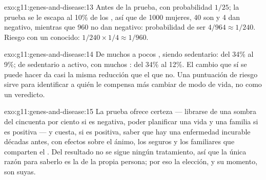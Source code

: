 \begin{solution}{exo:g11:genes-and-disease:13}
Antes de la prueba,  con probabilidad $1/25$; la prueba se le
escapa al 10\% de los , así que de 1000 mujeres, 40 son
 y 4 dan negativo, mientras que 960 no  dan
negativo: probabilidad de ser  $4/964 \approx 1/240$. Riesgo
con un  conocido: $1/240 \times 1/4
\approx 1/960$.
\end{solution}

\begin{solution}{exo:g11:genes-and-disease:14}
De muchos a pocos , siendo sedentario: del 34\% al 9\%; de
sedentario a activo, con muchos : del 34\% al 12\%. El cambio que
sí se puede hacer da casi la misma reducción que el que no. Una
puntuación de riesgo sirve para identificar a quién le compensa más
cambiar de modo de vida, no como un veredicto.
\end{solution}

\begin{solution}{exo:g11:genes-and-disease:15}
La prueba ofrece certeza --- librarse de una sombra del cincuenta por
ciento si es negativa, poder planificar una vida y una familia si es
positiva --- y cuesta, si es positiva, saber que hay una enfermedad
incurable décadas antes, con efectos sobre el ánimo, los seguros y los
familiares que comparten el . Del resultado no se sigue ningún
tratamiento, así que la única razón para saberlo es la de la propia
persona; por eso la elección, y su momento, son suyas.
\end{solution}

